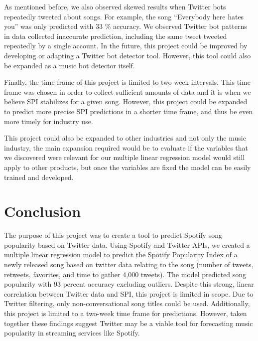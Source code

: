 \documentclass[12pt,conference]{IEEEtran}
\begin{document}
As mentioned before, we also observed skewed results when Twitter bots repeatedly tweeted about songs. For example, the song “Everybody here hates you” was only predicted with 33 \% accuracy. We observed Twitter bot patterns in data collected inaccurate prediction, including the same tweet tweeted repeatedly by a single account. In the future, this project could be improved by developing or adapting a Twitter bot detector tool. However, this tool could also be expanded as a music bot detector itself. \par

Finally, the time-frame of this project is limited to two-week intervals. This time-frame was chosen in order to collect sufficient amounts of data and it is when we believe SPI stabilizes for a given song. However, this project could be expanded to predict more precise SPI predictions in a shorter time frame, and thus be even more timely for industry use. \par
This project could also be expanded to other industries and not only the music industry, the main expansion required would be to evaluate if the variables that we discovered were relevant for our multiple linear regression model would still apply to other products, but once the variables are fixed the model can be easily trained and developed. 

\section{Conclusion}
The purpose of this project was to create a tool to predict Spotify song popularity based on Twitter data. Using Spotify and Twitter APIs, we created a multiple linear regression model to predict the Spotify Popularity Index of a newly released song based on twitter data relating to the song (number of tweets, retweets, favorites, and time to gather 4,000 tweets). The model predicted song popularity with 93 percent accuracy excluding outliers. Despite this strong, linear correlation between Twitter data and SPI, this project is limited in scope. Due to Twitter filtering, only non-conversational song titles could be used. Additionally, this project is limited to a two-week time frame for predictions. However, taken together these findings suggest Twitter may be a viable tool for forecasting music popularity in streaming services like Spotify. \par
\end{document}
